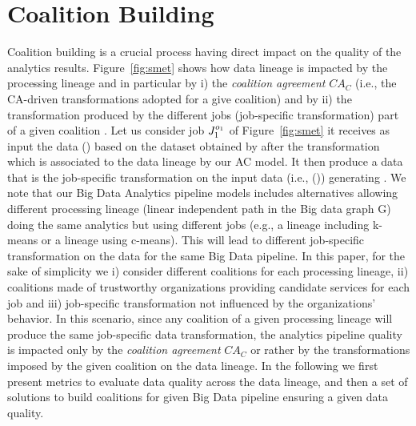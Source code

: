 \section{Coalition Building}\label{sec:coalition}
Coalition building is a crucial process having direct impact on the quality of the analytics results. Figure~\ref{fig:smet} shows how data lineage is impacted by the processing lineage and in particular by i) the \textit{coalition a\-greement} $\textit{CA}_C$ (i.e., the CA-driven transformations adopted for a give coalition) and by ii) the transformation produced by the different jobs (job-specific transformation) part of a given coalition \coalition{}.
Let us consider job $J_{1}^{o_{1}}$ of Figure~\ref{fig:smet} it receives as input the data () based on the dataset obtained by  after the transformation   which is associated to the data lineage by our AC model. It then produce a data that is the job-specific transformation on the input data (i.e., ()) generating .
We note that our Big Data Analytics pipeline models includes alternatives allowing different processing lineage (linear independent path in the Big data graph G) doing the same analytics but using different jobs (e.g., a lineage including k-means or a lineage using c-means). This will lead to different job-specific transformation on the data for the same Big Data pipeline.
In this paper, for the sake of simplicity we i) consider different coalitions for each processing lineage, ii) coalitions made of trustworthy organizations  providing candidate services for each job and iii) job-specific transformation not influenced by the organizations' behavior.
In this scenario, since any coalition of a given processing lineage will produce the same job-specific data transformation, the analytics pipeline quality is impacted only by the \textit{coalition agreement} $\textit{CA}_C$ or rather by the transformations  imposed by the given coalition \coalition{} on the data lineage.
In the following we first present metrics to evaluate data quality across the data lineage, and then a set of solutions to build coalitions for  given Big Data pipeline ensuring a given data quality.

